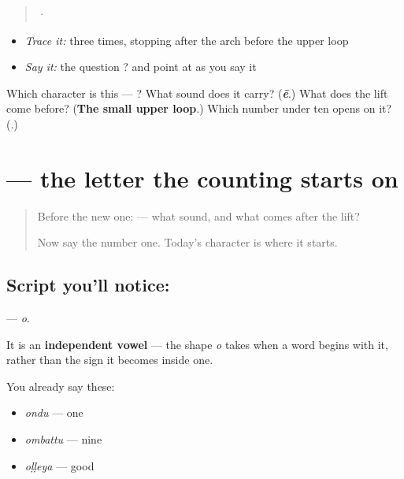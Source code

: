 \begin{quote}
  ·  
\end{quote}

\begin{itemize}
\raggedright
  \item \emph{Trace it:}  three times, stopping after the arch before the upper loop
  \item \emph{Say it:} the question   ? and point at  as you say it
\end{itemize}

\begin{tcolorbox}[breakable,colback=teal!4,colframe=teal!35!black,title={Before you move on}]
Which character is this — ? What sound does it carry? (\emph{\textbf{ē}}.) What does the lift come before? (\textbf{The small upper loop}.) Which number under ten opens on it? (\textbf{}.)
\end{tcolorbox}
\section[\texorpdfstring{\kn{ಒ} (o)}{ಒ (o)}]{ — the letter the counting starts on}

\label{lesson:KA-S158-letter-o}



\begin{quote}
Before the new one:  — what sound, and what comes after the lift?

Now say the number one. Today's character is where it starts.
\end{quote}

\subsection*{Script you'll notice: }
\textbf{} — \emph{o}.

It is an \textbf{independent vowel} — the shape \emph{o} takes when a word begins with it, rather than the sign it becomes inside one.

You already say these:

\begin{itemize}
\raggedright
  \item \textbf{} \emph{ondu} — one
  \item \textbf{} \emph{ombattu} — nine
  \item \textbf{} \emph{oḷḷeya} — good
\end{itemize}

